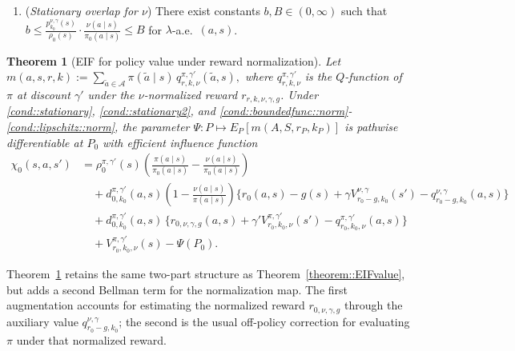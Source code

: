 \documentclass[12pt]{article}
\theoremstyle{plain}
\newtheorem{theorem}{Theorem}
\begin{document}
\begin{enumerate}[label=\textbf{(D\arabic*)}, ref=D\arabic*, resume=condexample]
    \item (\textit{Stationary overlap for $\nu$}) There exist constants
    $b, B \in (0,\infty)$ such that
    $b \le \frac{p_{k_0}^{\nu,\gamma}(s)}{\rho_0(s)}
    \cdot \frac{\nu(a \mid s)}{\pi_0(a \mid s)} \le B$
    for $\lambda$-a.e.\ $(a,s)$. \label{cond::stationary2}
\end{enumerate}

\begingroup
\begin{theorem}[EIF for policy value under reward normalization]
\label{theorem::EIFvaluenorm}
Let $m(a,s,r,k)
:= \sum_{\tilde a \in \mathcal A}\pi(\tilde a \mid s)\,
q_{r,k,\nu}^{\pi,\gamma'}(\tilde a,s),$ where \(q_{r,k,\nu}^{\pi,\gamma'}\) is the \(Q\)-function of \(\pi\) at discount
\(\gamma'\) under the \(\nu\)-normalized reward \(r_{r,k,\nu,\gamma,g}\).
Under \ref{cond::stationary}, \ref{cond::stationary2}, and
\ref{cond::boundedfunc::norm}-\ref{cond::lipschitz::norm}, the parameter
\(\Psi: P \mapsto E_P[m(A,S,r_P,k_P)]\) is pathwise differentiable at \(P_0\)
with efficient influence function
\begin{align*}
\chi_0(s,a,s')
&= \rho_0^{\pi,\gamma'}(s)\left(\frac{\pi(a\mid s)}{\pi_0(a\mid s)}
   - \frac{\nu(a\mid s)}{\pi_0(a\mid s)}\right) \\[4pt]
&\quad + d_{0,k_0}^{\pi,\gamma'}(a,s)
   \left(1 - \frac{\nu(a \mid s)}{\pi(a \mid s)}\right)
   \bigl\{r_0(a,s) - g(s) + \gamma V_{r_0-g, k_0}^{\nu,\gamma}(s')
   - q_{r_0-g, k_0}^{\nu,\gamma}(a,s)\bigr\} \\[4pt]
&\quad + d_{0,k_0}^{\pi,\gamma'}(a,s)\,
   \bigl\{r_{0,\nu,\gamma,g}(a,s)
   + \gamma' V_{r_0, k_0,\nu}^{\pi,\gamma'}(s')
   - q_{r_0, k_0,\nu}^{\pi,\gamma'}(a,s)\bigr\} \\[4pt]
&\quad + V_{r_0,k_0,\nu}^{\pi,\gamma'}(s) - \Psi(P_0).
\end{align*}
\end{theorem}
\endgroup

\noindent Theorem~\ref{theorem::EIFvaluenorm} retains the same two-part
structure as Theorem~\ref{theorem::EIFvalue}, but adds a second Bellman term
for the normalization map. The first augmentation accounts for estimating the
normalized reward \(r_{0,\nu,\gamma,g}\) through the auxiliary value
\(q_{r_0-g,k_0}^{\nu,\gamma}\); the second is the usual off-policy correction
for evaluating \(\pi\) under that normalized reward.

 
\end{document}
